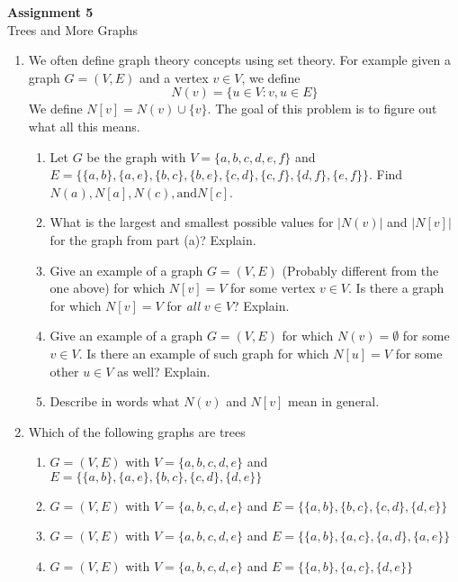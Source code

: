 \documentclass[11pt, letterpaper, includehead]{article}
\theoremstyle{plain}
\theoremstyle{mydefinition}
\theoremstyle{myproperty}
\begin{document}
\pagestyle{fancy}
\fancyhead{}
\fancyfoot{}

\begin{center}
    \Large{\textbf{Assignment 5}}\\
    \Large{Trees and More Graphs}
\end{center}

\begin{enumerate}[label=\textbf{\arabic*}., leftmargin=*]
    \item We often define graph theory concepts using set theory. For example given a graph $G = (V, E)$ and a vertex $v \in V$, we define
    \[N(v) = \{ u \in V : {v, u} \in E\} \]
    We define $N[v] = N(v) \cup \{ v\} $. The goal of this problem is to figure out what all this means.

        
    \begin{enumerate}[label=(\alph*)]
        \item Let $G$ be the graph with $V = \{ a,b,c,d,e,f \} $ and
            \\$E = \{  \{ a,b \}, \{ a,e \},\{ b,c \}, \{ b,e \}, \{ c, d\}, \{ c, f\}, \{ d,f \}, \{ e,f \} \} $. 
            Find $N(a), N[a], N(c), \text{and} N[c]$.
        \item What is the largest and smallest possible values for $|N(v)|$ and $|N[v]|$ for the graph from part (a)? Explain.
        \item Give an example of a graph $G = (V, E)$ (Probably different from the one above) for which $N[v] = V$ for some vertex $v \in V$. Is there a graph for which $N[v] = V$ for \emph{all} $v \in V$? Explain.
        \item Give an example of a graph $G = (V, E)$ for which $N(v) = \emptyset$  for some $v \in V$. Is there an example of such graph for which $N[u] = V$ for some other $u \in V$ as well? Explain.
        \item Describe in words what $N(v)$ and $N[v]$ mean in general.
    \end{enumerate}

    \item Which of the following graphs are trees
    \begin{enumerate}[label=(\alph*)]
        \item $G = (V, E)$ with $V = \{a, b, c, d, e\}$ and $E = \{ \{a, b \}, \{a, e \}, \{b, c \}, \{c, d \}, \{d, e\}\}$
        \item $G = (V, E)$ with $V = \{a, b, c, d, e\}$ and $E = \{ \{a, b \}, \{b, c \}, \{c, d \}, \{d, e \}\}$
        \item $G = (V, E)$ with $V = \{a, b, c, d, e\}$ and $E = \{ \{a, b \}, \{a, c \}, \{a, d \}, \{a, e \}\}$
        \item $G = (V, E)$ with $V = \{a, b, c, d, e\}$ and $E = \{ \{a, b \}, \{a, c \}, \{d, e \}\}$
    \end{enumerate}


\end{enumerate}
\end{document}
